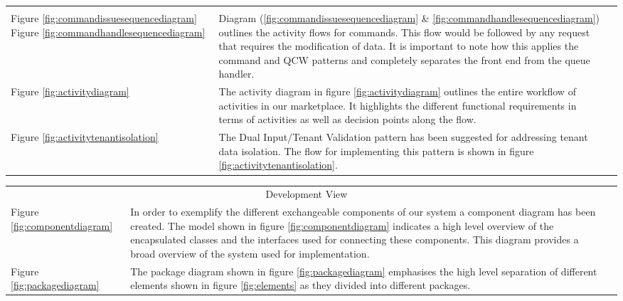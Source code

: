 \begin{table}[htp]
\centering
\begin{tabularx}{\textwidth}{lXl}
\cline{1-2}
\multicolumn{2}{|c|}{\cellcolor[HTML]{EFEFEF}{\color[HTML]{000000} Process View}} &  \\ \cline{1-2}
\multicolumn{1}{|l|}{
Figure \ref{fig:commandissuesequencediagram} Figure \ref{fig:commandhandlesequencediagram}} & \multicolumn{1}{X|}{Diagram (\ref{fig:commandissuesequencediagram} \& \ref{fig:commandhandlesequencediagram}) outlines the activity flows for commands. This flow would be followed by any request that requires the modification of data. It is important to note how this applies the command and QCW \index{Queue Centric Workflow} patterns and completely separates the front end from the queue handler.} &  \\ \cline{1-2}
\multicolumn{1}{|l|}{Figure \ref{fig:activitydiagram}} & \multicolumn{1}{X|}{The activity diagram in figure \ref{fig:activitydiagram} outlines the entire workflow of activities in our marketplace. It highlights the different functional requirements in terms of activities as well as decision points along the flow.} &  \\ \cline{1-2}
\multicolumn{1}{|l|}{Figure \ref{fig:activitytenantisolation}} & \multicolumn{1}{X|}{The Dual Input/Tenant Validation pattern has been suggested for addressing tenant data isolation. The flow for implementing this pattern is shown in figure \ref{fig:activitytenantisolation}.} &  \\ \cline{1-2}
\end{tabularx}
\label{tab:processview}
\end{table}

\begin{table}[htp]
\centering
\begin{tabularx}{\textwidth}{lXl}
\cline{1-2}
\multicolumn{2}{|c|}{\cellcolor[HTML]{EFEFEF}Development View} &  \\ \cline{1-2}
\multicolumn{1}{|l|}{Figure \ref{fig:componentdiagram}} & \multicolumn{1}{X|}{In order to exemplify the different exchangeable components of our system a component diagram has been created. The model shown in figure \ref{fig:componentdiagram} indicates a high level overview of the encapsulated classes and the interfaces used for connecting these components. This diagram provides a broad overview of the system used for implementation.} &  \\ \cline{1-2}
\multicolumn{1}{|l|}{Figure \ref{fig:packagediagram}} & \multicolumn{1}{X|}{The package diagram shown in figure \ref{fig:packagediagram} emphasises the high level separation of different elements shown in figure \ref{fig:elements} as they divided into different packages.} &  \\ \cline{1-2}
\end{tabularx}
\label{tab:developmentview}
\end{table}



